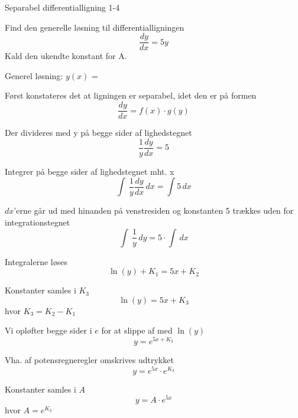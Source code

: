 \documentclass{article}
\begin{document}
\begin{exercise}{Separabel differentialligning 1-4}


Find den generelle løsning til differentialligningen
\[
\frac{dy}{dx} = 5y
\]
Kald den ukendte konstant for A.

Generel løsning: $y(x)$ = 

\hint

Først konstateres det at ligningen er separabel, idet den er på formen
\[
\frac{dy}{dx} = f(x) \cdot g(y)
\]

\hint
Der divideres med y på begge sider af lighedstegnet
\[
\frac{1}{y} \frac{dy}{dx} = 5
\]

\hint

Integrer på begge sider af lighedstegnet mht. x
\[
\int\ \frac{1}{y} \frac{dy}{dx} \, dx= \int 5 \,dx
\]

\hint

$dx$'erne går ud med hinanden på venstresiden og konstanten 5 trækkes uden for integrationstegnet
\[
\int\ \frac{1}{y}\, dy= 5 \cdot \int \,dx
\]

\hint

Integralerne løses
\[
\ln(y) + K_1 =5x + K_2
\]


\hint

Konstanter samles i $K_3$
\[
\ln(y) =5x + K_3
\]
hvor $K_3=K_2 - K_1$

\hint

Vi opløfter begge sider i $e$ for at slippe af med $\ln(y)$
\[
y = e^{5x + K_3}
\]

\hint

Vha. af potensregneregler omskrives udtrykket
\[
y = e^{5x} \cdot e^{K_3}
\]

\hint

Konstanter samles i $A$
\[
y = A \cdot e^{5x}
\]
hvor $ A= e^{K_3}$

\end{exercise}

\newpage
\end{document}
